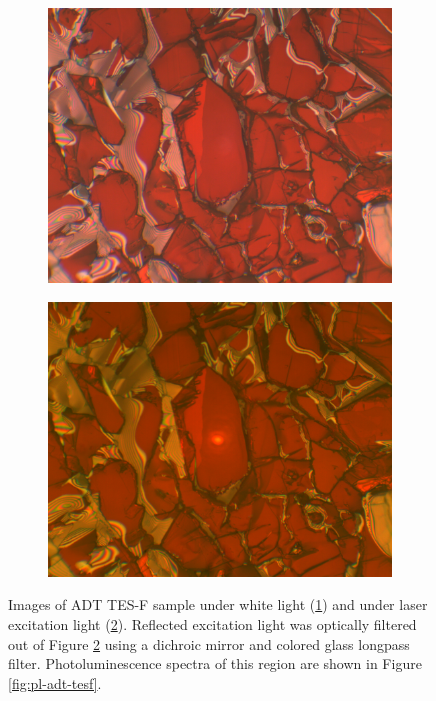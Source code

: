 \begin{figure}[H]
    \centering
    \begin{subfigure}[b]{0.45\textwidth}
        \includegraphics[width=\textwidth]{./img/tesf-white-illum.png}
        \caption{}
        \label{img:tesf-white}
    \end{subfigure}
    \hfill
    \begin{subfigure}[b]{0.45\textwidth}
        \includegraphics[width=\textwidth]{./img/tesf-laser-illum.png}
        \caption{}
        \label{img:tesf-laser}
    \end{subfigure}
    \caption[Images of ADT TES-F sample.]{Images of ADT TES-F sample under white light (\ref{img:tesf-white}) and under laser excitation light (\ref{img:tesf-laser}). Reflected excitation light was optically filtered out of Figure \ref{img:tesf-laser} using a dichroic mirror and colored glass longpass filter. Photoluminescence spectra of this region are shown in Figure \ref{fig:pl-adt-tesf}.}
    \label{img:tesf}
\end{figure}

